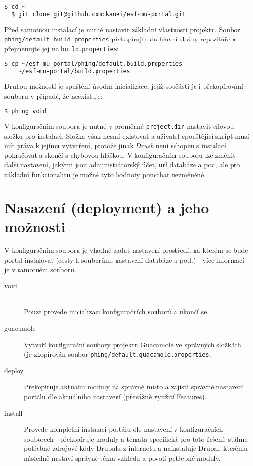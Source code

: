 \begin{lstlisting}[language=bash]
  $ cd ~
  $ git clone git@github.com:kanei/esf-mu-portal.git  
\end{lstlisting}

Před samotnou instalací je nutné nastavit základní vlastnosti projektu. Soubor \texttt{phing/default.build.properties} překopírujte do hlavní složky repozitáře a přejmenujte jej na \texttt{build.properties}:

\begin{lstlisting}[language=bash]
  $ cp ~/esf-mu-portal/phing/default.build.properties 
    ~/esf-mu-portal/build.properties
\end{lstlisting}

Druhou možností je spuštění úvodní inicializace, jejíž součástí je i překopírování souboru v případě, že neexistuje:

\begin{lstlisting}[language=bash]
  $ phing void
\end{lstlisting}

V konfiguračním souboru je nutné v proměnné \texttt{project.dir} nastavit cílovou složku pro instalaci. Složka však nesmí existovat a uživatel spouštějící skript musí mít práva k jejímu vytvoření, protože jinak \emph{Drush} není schopen s instalací pokračovat a skončí s chybovou hláškou. V konfiguračním souboru lze změnit další nastavení, jakými jsou administrátorský účet, url databáze a pod, ale pro základní funkcionalitu je možné tyto hodnoty ponechat nezměněné.


\section{Nasazení (deployment) a jeho možnosti}



V konfiguračním souboru je vhodné zadat nastavení prostředí, na kterém se bude portál instalovat (cesty k souborům, nastavení databáze a pod.) - více informací je v samotném souboru.

\begin{description}
  \item[void] \hfill \\
  Pouze provede inicializaci konfiguračních souborů a ukončí se.  
  \item[guacamole] 
  Vytvoří konfigurační soubory projektu Guacamole ve správných složkách (je zkopírován soubor \texttt{phing/default.guacamole.properties}.
  \item[deploy]
  Překopíruje aktuální moduly na správné místo a zajistí správné nastavení portálu dle aktuálního nastavení (převážně využití Features).
  \item[install]
  Provede kompletní instalaci portálu dle nastavení v konfiguračních souborech - překopíruje moduly a témata specifická pro toto řešení, stáhne potřebné zdrojové kódy Drupalu z internetu a nainstaluje Drupal, kterému následně nastaví správné téma vzhledu a povolí potřebné moduly.
\end{description}

